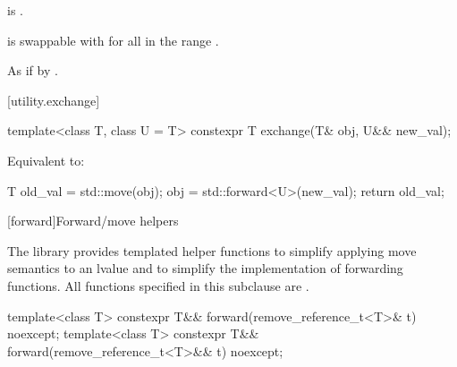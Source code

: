 \begin{itemdescr}
\pnum
\constraints
{} is .

\pnum
\expects
{} is swappable with 
for all  in the range .

\pnum
\effects
As if by .
\end{itemdescr}

[utility.exchange]{}

%
\begin{itemdecl}
template<class T, class U = T>
  constexpr T exchange(T& obj, U&& new_val);
\end{itemdecl}

\begin{itemdescr}
\pnum
\effects
Equivalent to:
\begin{codeblock}
T old_val = std::move(obj);
obj = std::forward<U>(new_val);
return old_val;
\end{codeblock}
\end{itemdescr}


[forward]{Forward/move helpers}

\pnum
The library provides templated helper functions to simplify
applying move semantics to an lvalue and to simplify the implementation
of forwarding functions.
%
%
%
All functions specified in this subclause are .

%
%
\begin{itemdecl}
template<class T> constexpr T&& forward(remove_reference_t<T>& t) noexcept;
template<class T> constexpr T&& forward(remove_reference_t<T>&& t) noexcept;
\end{itemdecl}

